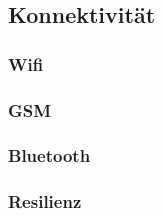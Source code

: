 \subsection{Konnektivität}
\label{subsec:konnektivitat}

\subsubsection{Wifi}

\subsubsection{GSM}
\label{subsubsec:gsm}

\subsubsection{Bluetooth}

\subsubsection{Resilienz}
